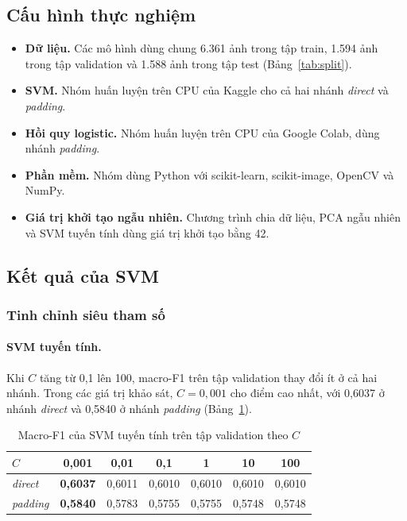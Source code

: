 \subsection{Cấu hình thực nghiệm}

\begin{itemize}
  \item \textbf{Dữ liệu.} Các mô hình dùng chung 6.361 ảnh trong tập train, 1.594 ảnh trong tập validation và 1.588 ảnh trong tập test (Bảng~\ref{tab:split}).
  \item \textbf{SVM.} Nhóm huấn luyện trên CPU của Kaggle cho cả hai nhánh \emph{direct} và \emph{padding}.
  \item \textbf{Hồi quy logistic.} Nhóm huấn luyện trên CPU của Google Colab, dùng nhánh \emph{padding}.
  \item \textbf{Phần mềm.} Nhóm dùng Python với scikit-learn, scikit-image, OpenCV và NumPy.
  \item \textbf{Giá trị khởi tạo ngẫu nhiên.} Chương trình chia dữ liệu, PCA ngẫu nhiên và SVM tuyến tính dùng giá trị khởi tạo bằng 42.
\end{itemize}

\subsection{Kết quả của SVM}

\subsubsection{Tinh chỉnh siêu tham số}
\label{sec:svm_tuning}

\paragraph{SVM tuyến tính.} Khi $C$ tăng từ 0,1 lên 100, macro-F1 trên tập validation thay đổi ít ở cả hai nhánh. Trong các giá trị khảo sát, $C = 0{,}001$ cho điểm cao nhất, với 0,6037 ở nhánh \emph{direct} và 0,5840 ở nhánh \emph{padding} (Bảng~\ref{tab:tune_linear}).

\begin{table}[H]
\centering
\caption{Macro-F1 của SVM tuyến tính trên tập validation theo $C$}
\label{tab:tune_linear}
\begin{tabular}{@{}lcccccc@{}}
\toprule
$C$ & 0,001 & 0,01 & 0,1 & 1 & 10 & 100 \\
\midrule
\emph{direct}  & \textbf{0,6037} & 0,6011 & 0,6010 & 0,6010 & 0,6010 & 0,6010 \\
\emph{padding} & \textbf{0,5840} & 0,5783 & 0,5755 & 0,5755 & 0,5748 & 0,5748 \\
\bottomrule
\end{tabular}
\end{table}

